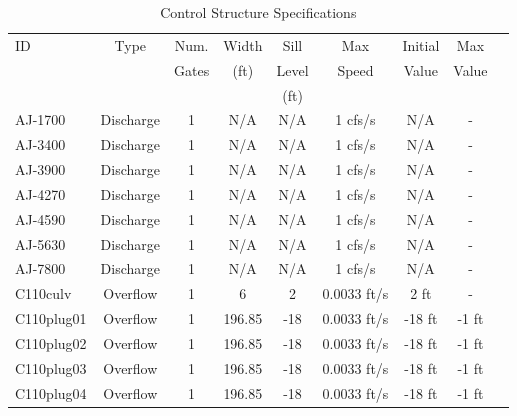 \scriptsize
\begin{table}[h]
\caption{Control Structure Specifications}
\label{tab:struc-specs1}
\begin{tabular}{@{}lcccccccc@{}}
\toprule
{ID}            & {Type}        & Num.     & Width       & Sill         & Max         & Initial         & Max       \\
                &               & Gates    & (ft)        & Level        & Speed       & Value           & Value     \\
                &               &          &             & (ft)         &             &                 &           \\
\hline
{AJ-1700}       & Discharge     & 1        & N/A         & N/A          & 1 cfs/s         & N/A             & -            \\
{AJ-3400}       & Discharge     & 1        & N/A         & N/A          & 1 cfs/s         & N/A             & -            \\
{AJ-3900}       & Discharge     & 1        & N/A         & N/A          & 1 cfs/s         & N/A             & -            \\
{AJ-4270}       & Discharge     & 1        & N/A         & N/A          & 1 cfs/s         & N/A             & -            \\
{AJ-4590}       & Discharge     & 1        & N/A         & N/A          & 1 cfs/s         & N/A             & -            \\
{AJ-5630}       & Discharge     & 1        & N/A         & N/A          & 1 cfs/s         & N/A             & -            \\
{AJ-7800}       & Discharge     & 1        & N/A         & N/A          & 1 cfs/s         & N/A             & -            \\
{C110culv}      & Overflow      & 1        & 6           & 2            & 0.0033 ft/s     & 2 ft            & -            \\
{C110plug01}    & Overflow      & 1        & 196.85      & -18          & 0.0033 ft/s     & -18 ft          & -1 ft           \\
{C110plug02}    & Overflow      & 1        & 196.85      & -18          & 0.0033 ft/s     & -18 ft          & -1 ft           \\
{C110plug03}    & Overflow      & 1        & 196.85      & -18          & 0.0033 ft/s     & -18 ft          & -1 ft           \\
{C110plug04}    & Overflow      & 1        & 196.85      & -18          & 0.0033 ft/s     & -18 ft          & -1 ft           \\

\end{tabular}
\end{table}
